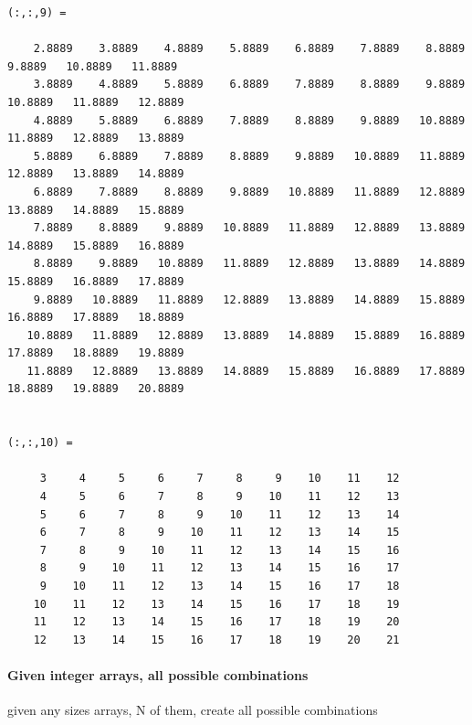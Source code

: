 \documentclass[
]{book}
\begin{document}
\begin{verbatim}
(:,:,9) =

    2.8889    3.8889    4.8889    5.8889    6.8889    7.8889    8.8889    9.8889   10.8889   11.8889
    3.8889    4.8889    5.8889    6.8889    7.8889    8.8889    9.8889   10.8889   11.8889   12.8889
    4.8889    5.8889    6.8889    7.8889    8.8889    9.8889   10.8889   11.8889   12.8889   13.8889
    5.8889    6.8889    7.8889    8.8889    9.8889   10.8889   11.8889   12.8889   13.8889   14.8889
    6.8889    7.8889    8.8889    9.8889   10.8889   11.8889   12.8889   13.8889   14.8889   15.8889
    7.8889    8.8889    9.8889   10.8889   11.8889   12.8889   13.8889   14.8889   15.8889   16.8889
    8.8889    9.8889   10.8889   11.8889   12.8889   13.8889   14.8889   15.8889   16.8889   17.8889
    9.8889   10.8889   11.8889   12.8889   13.8889   14.8889   15.8889   16.8889   17.8889   18.8889
   10.8889   11.8889   12.8889   13.8889   14.8889   15.8889   16.8889   17.8889   18.8889   19.8889
   11.8889   12.8889   13.8889   14.8889   15.8889   16.8889   17.8889   18.8889   19.8889   20.8889


(:,:,10) =

     3     4     5     6     7     8     9    10    11    12
     4     5     6     7     8     9    10    11    12    13
     5     6     7     8     9    10    11    12    13    14
     6     7     8     9    10    11    12    13    14    15
     7     8     9    10    11    12    13    14    15    16
     8     9    10    11    12    13    14    15    16    17
     9    10    11    12    13    14    15    16    17    18
    10    11    12    13    14    15    16    17    18    19
    11    12    13    14    15    16    17    18    19    20
    12    13    14    15    16    17    18    19    20    21
\end{verbatim}

\hypertarget{given-integer-arrays-all-possible-combinations}{%
\paragraph{Given integer arrays, all possible combinations}\label{given-integer-arrays-all-possible-combinations}}

given any sizes arrays, N of them, create all possible combinations
\end{document}
